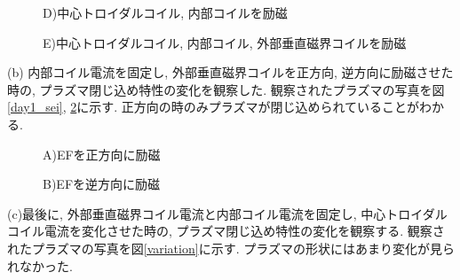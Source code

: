 \documentclass[]{jsarticle}
\begin{document}
	\begin{figure}[htbp]
		\begin{minipage}{0.33\hsize}
			\begin{center}
				\caption{D)中心トロイダルコイル, 内部コイルを励磁}
				\label{day1_D}
			\end{center}
		\end{minipage}
		\begin{minipage}{0.33\hsize}
			\begin{center}
				\caption{E)中心トロイダルコイル, 内部コイル, 外部垂直磁界コイルを励磁}
				\label{day1_E}
			\end{center}
		\end{minipage}
	\end{figure}
	
	(b) 内部コイル電流を固定し, 外部垂直磁界コイルを正方向, 逆方向に励磁させた時の, プラズマ閉じ込め特性の変化を観察した. 観察されたプラズマの写真を図\ref{day1_sei}, \ref{day1_gyaku}に示す. 正方向の時のみプラズマが閉じ込められていることがわかる. 
	
	\begin{figure}[htbp]
		\begin{minipage}{0.5\hsize}
			\begin{center}
				\caption{A)EFを正方向に励磁}
				\label{day1_sei}
			\end{center}
		\end{minipage}
		\begin{minipage}{0.5\hsize}
			\begin{center}
				\caption{B)EFを逆方向に励磁}
				\label{day1_gyaku}
			\end{center}
		\end{minipage}
	\end{figure}

	(c)最後に, 外部垂直磁界コイル電流と内部コイル電流を固定し, 中心トロイダルコイル電流を変化させた時の, プラズマ閉じ込め特性の変化を観察する. 観察されたプラズマの写真を図\ref{variation}に示す. プラズマの形状にはあまり変化が見られなかった. 
	
\end{document}
